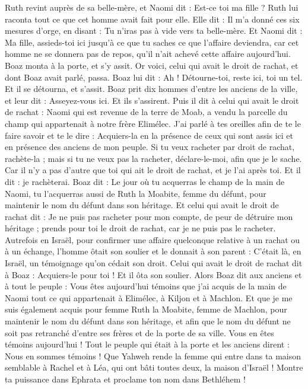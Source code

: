 \begin{multicols}{2}
Ruth revint auprès de sa belle-mère, et Naomi dit : Est-ce toi ma fille ? Ruth lui raconta tout ce que cet homme avait fait pour elle.
Elle dit : Il m'a donné ces six mesures d'orge, en disant : Tu n'iras pas à vide vers ta belle-mère.
Et Naomi dit : Ma fille, assieds-toi ici jusqu'à ce que tu saches ce que l'affaire deviendra, car cet homme ne se donnera pas de repos, qu'il n'ait achevé cette affaire aujourd'hui.
\VerseOne{}Boaz monta à la porte, et s'y assit. Or voici, celui qui avait le droit de rachat, et dont Boaz avait parlé, passa. Boaz lui dit : Ah ! Détourne-toi, reste ici, toi un tel. Et il se détourna, et s'assit.
Boaz prit dix hommes d'entre les anciens de la ville, et leur dit : Asseyez-vous ici. Et ils s'assirent.
Puis il dit à celui qui avait le droit de rachat : Naomi qui est revenue de la terre de Moab, a vendu la parcelle du champ qui appartenait à notre frère Elimélec.
J'ai parlé à tes oreilles afin de te le faire savoir et te le dire : Acquiers-la en la présence de ceux qui sont assis ici et en présence des anciens de mon peuple. Si tu veux racheter par droit de rachat, rachète-la ; mais si tu ne veux pas la racheter, déclare-le-moi, afin que je le sache. Car il n'y a pas d'autre que toi qui ait le droit de rachat, et je l'ai après toi. Et il dit : je rachèterai.
Boaz dit : Le jour où tu acquerras le champ de la main de Naomi, tu l'acquerras aussi de Ruth la Moabite, femme du défunt, pour maintenir le nom du défunt dans son héritage.
Et celui qui avait le droit de rachat dit : Je ne puis pas racheter pour mon compte, de peur de détruire mon héritage ; prends pour toi le droit de rachat, car je ne puis pas le racheter.
Autrefois en Israël, pour confirmer une affaire quelconque relative à un rachat ou à un échange, l'homme ôtait son soulier et le donnait à son parent : C'était là, en Israël, un témoignage qu'on cédait son droit.
Celui qui avait le droit de rachat dit à Boaz : Acquiers-le pour toi ! Et il ôta son soulier.
Alors Boaz dit aux anciens et à tout le peuple : Vous êtes aujourd'hui témoins que j'ai acquis de la main de Naomi tout ce qui appartenait à Elimélec, à Kiljon et à Machlon.
Et que je me suis également acquis pour femme Ruth la Moabite, femme de Machlon, pour maintenir le nom du défunt dans son héritage, et afin que le nom du défunt ne soit pas retranché d'entre ses frères et de la porte de sa ville. Vous en êtes témoins aujourd'hui !
Tout le peuple qui était à la porte et les anciens dirent : Nous en sommes témoins ! Que Yahweh rende la femme qui entre dans ta maison semblable à Rachel et à Léa, qui ont bâti toutes deux, la maison d'Israël ! Montre ta puissance dans Ephrata et proclame ton nom dans Bethléhem !

\end{multicols}
